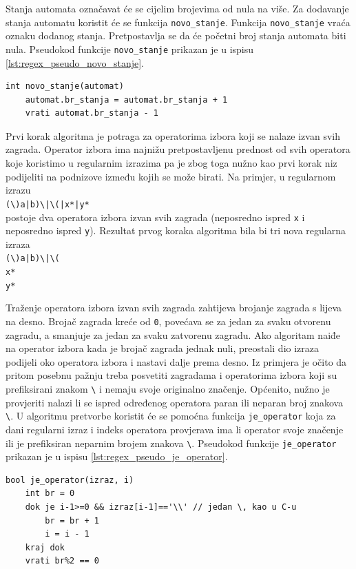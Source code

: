 \documentclass[times, 12pt, utf8]{book}
\begin{document}
Stanja automata označavat će se cijelim brojevima od nula na više.
Za dodavanje stanja automatu koristit će se funkcija \verb|novo_stanje|.
Funkcija \verb|novo_stanje| vraća oznaku dodanog stanja.
Pretpostavlja se da će početni broj stanja automata biti nula.
Pseudokod funkcije \verb|novo_stanje| prikazan je u ispisu \ref{lst:regex_pseudo_novo_stanje}.

\begin{lstlisting}[caption={Pseudokod funkcije za dodavanje stanja automatu.},label=lst:regex_pseudo_novo_stanje]
int novo_stanje(automat)
	automat.br_stanja = automat.br_stanja + 1
	vrati automat.br_stanja - 1
\end{lstlisting}

Prvi korak algoritma je potraga za operatorima izbora koji se nalaze izvan svih zagrada.
Operator izbora ima najnižu pretpostavljenu prednost od svih operatora koje koristimo u regularnim izrazima pa je zbog toga nužno kao prvi korak niz podijeliti na podnizove između kojih se može birati.
Na primjer, u regularnom izrazu\\
\verb=(\)a|b)\|\(|x*|y*=\\
postoje dva operatora izbora izvan svih zagrada (neposredno ispred \verb|x| i neposredno ispred \verb|y|).
Rezultat prvog koraka algoritma bila bi tri nova regularna izraza\\
\verb=(\)a|b)\|\(=\\
\verb|x*|\\
\verb|y*|

Traženje operatora izbora izvan svih zagrada zahtijeva brojanje zagrada s lijeva na desno.
Brojač zagrada kreće od \verb|0|, povećava se za jedan za svaku otvorenu zagradu, a smanjuje za jedan za svaku zatvorenu zagradu.
Ako algoritam naiđe na operator izbora kada je brojač zagrada jednak nuli, preostali dio izraza podijeli oko operatora izbora i nastavi dalje prema desno.
Iz primjera je očito da pritom posebnu pažnju treba posvetiti zagradama i operatorima izbora koji su prefiksirani znakom \verb|\| i nemaju svoje originalno značenje.
Općenito, nužno je provjeriti nalazi li se ispred određenog operatora paran ili neparan broj znakova \verb|\|.
U algoritmu pretvorbe koristit će se pomoćna funkcija \verb|je_operator| koja za dani regularni izraz i indeks operatora provjerava ima li operator svoje značenje ili je prefiksiran neparnim brojem znakova \verb|\|.
Pseudokod funkcije \verb|je_operator| prikazan je u ispisu \ref{lst:regex_pseudo_je_operator}.

\begin{lstlisting}[caption={Pseudokod funkcije \texttt{je\_operator}.},label=lst:regex_pseudo_je_operator]
bool je_operator(izraz, i)
	int br = 0
	dok je i-1>=0 && izraz[i-1]=='\\' // jedan \, kao u C-u
	    br = br + 1
	    i = i - 1
	kraj dok
	vrati br%2 == 0
\end{lstlisting}
\end{document}
